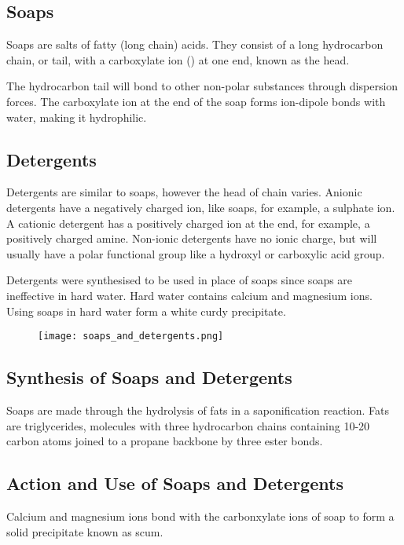 	\subsection{Soaps}
	
		Soaps are salts of fatty (long chain) acids. They consist of a long hydrocarbon chain, or tail, with a carboxylate ion () at one end, known as the head.

		The hydrocarbon tail will bond to other non-polar substances through dispersion forces. The carboxylate ion at the end of the soap forms ion-dipole bonds with water, making it hydrophilic.

	\subsection{Detergents}
	
		Detergents are similar to soaps, however the head of chain varies. Anionic detergents have a negatively charged ion, like soaps, for example, a sulphate ion. A cationic detergent has a positively charged ion at the end, for example, a positively charged amine. Non-ionic detergents have no ionic charge, but will usually have a polar functional group like a hydroxyl or carboxylic acid group.

		Detergents were synthesised to be used in place of soaps since soaps are ineffective in hard water. Hard water contains calcium and magnesium ions. Using soaps in hard water form a white curdy precipitate.

		\begin{figure}[H]
			\centering
			\texttt{[image: soaps\_and\_detergents.png]}
		\end{figure}

	\subsection{Synthesis of Soaps and Detergents}
	
		Soaps are made through the hydrolysis of fats in a saponification reaction. Fats are triglycerides, molecules with three hydrocarbon chains containing 10-20 carbon atoms joined to a propane backbone by three ester bonds.

	\subsection{Action and Use of Soaps and Detergents}

		Calcium and magnesium ions bond with the carbonxylate ions of soap to form a solid precipitate known as scum.

